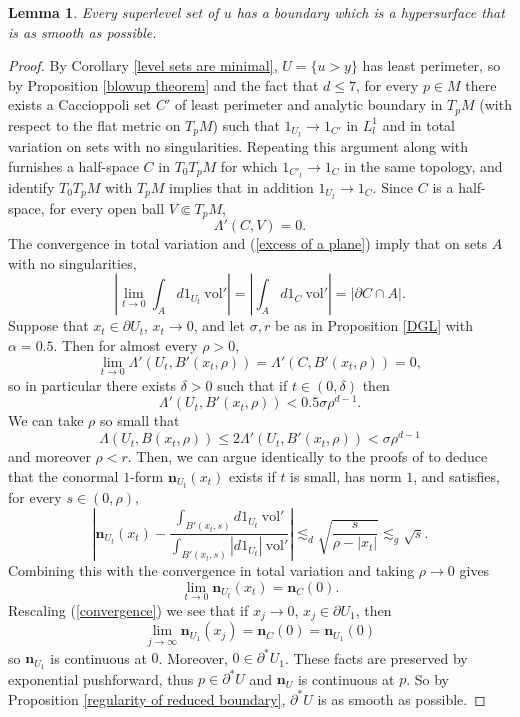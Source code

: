 \documentclass[reqno,12pt,letterpaper]{amsart}
\newcommand{\normal}{\mathbf n}
\newcommand{\vol}{\mathrm{vol}}
\newtheorem{lemma}[theorem]{Lemma}
\theoremstyle{definition}
\numberwithin{equation}{section}
\begin{document}
\begin{lemma}
Every superlevel set of $u$ has a boundary which is a hypersurface that is as smooth as possible.
\end{lemma}
\begin{proof}
By Corollary \ref{level sets are minimal}, $U = \{u > y\}$ has least perimeter, so by Proposition \ref{blowup theorem} and the fact that $d \leq 7$, for every $p \in M$ there exists a Caccioppoli set $C'$ of least perimeter and analytic boundary in $T_pM$ (with respect to the flat metric on $T_pM$) such that $1_{U_t} \to 1_{C'}$ in $L^1_l$ and in total variation on sets with no singularities.
Repeating this argument along with \cite[Theorem 9.3]{Giusti77} furnishes a half-space $C$ in $T_0T_pM$ for which $1_{C'_t} \to 1_C$ in the same topology, and identify $T_0T_pM$ with $T_pM$ implies that in addition $1_{U_t} \to 1_C$.
Since $C$ is a half-space, for every open ball $V \Subset T_pM$,
\begin{equation}\label{excess of a plane}
\Lambda'(C, V) = 0.
\end{equation}
The convergence in total variation and (\ref{excess of a plane}) imply that on sets $A$ with no singularities,
$$\left|\lim_{t \to 0} \int_A d1_{U_t} ~\vol'\right| = \left|\int_A d1_C ~\vol'\right| = |\partial C \cap A|.$$
Suppose that $x_t \in \partial U_t$, $x_t \to 0$, and let $\sigma,r$ be as in Proposition \ref{DGL} with $\alpha = 0.5$.
Then for almost every $\rho > 0$,
$$\lim_{t \to 0} \Lambda'(U_t, B'(x_t, \rho)) = \Lambda'(C, B'(x_t, \rho)) = 0,$$
so in particular there exists $\delta > 0$ such that if $t \in (0, \delta)$ then
$$\Lambda'(U_t, B'(x_t, \rho)) < 0.5 \sigma \rho^{d - 1}.$$
We can take $\rho$ so small that
$$\Lambda(U_t, B(x_t, \rho)) \leq 2\Lambda'(U_t, B'(x_t, \rho)) < \sigma \rho^{d - 1}$$
and moreover $\rho < r$.
Then, we can argue identically to the proofs of \cite[Teorema 5.7, Corollario 6.3]{Miranda66} to deduce that the conormal $1$-form $\normal_{U_t}(x_t)$ exists if $t$ is small, has norm $1$, and satisfies, for every $s \in (0, \rho)$,
$$\left|\normal_{U_t}(x_t) - \frac{\int_{B'(x_t, s)} d1_{U_t} ~\vol'}{\int_{B'(x_t, s)} |d1_{U_t}| ~\vol'}\right| \lesssim_d \sqrt{\frac{s}{\rho - |x_t|}} \lesssim_g \sqrt s.$$
Combining this with the convergence in total variation and taking $\rho \to 0$ gives
\begin{equation}
\label{convergence}
\lim_{t \to 0} \normal_{U_t}(x_t) = \normal_C(0).
\end{equation}
Rescaling (\ref{convergence}) we see that if $x_j \to 0$, $x_j \in \partial U_1$, then
$$\lim_{j \to \infty} \normal_{U_1}(x_j) = \normal_C(0) = \normal_{U_1}(0)$$
so $\normal_{U_1}$ is continuous at $0$. Moreover, $0 \in \partial^* U_1$.
These facts are preserved by exponential pushforward, thus $p \in \partial^* U$ and $\normal_U$ is continuous at $p$.
So by Proposition \ref{regularity of reduced boundary}, $\partial^* U$ is as smooth as possible.
\end{proof}
\end{document}
